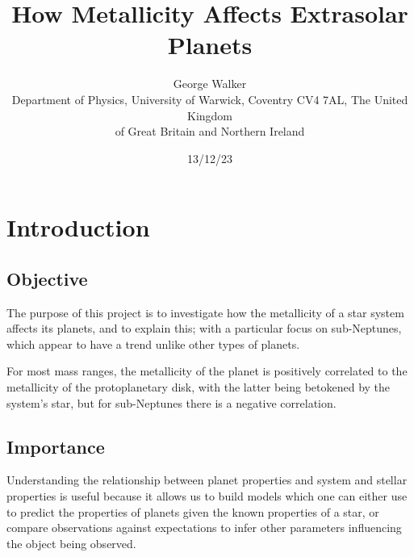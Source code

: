 \documentclass[a4paper,twocolumn,12pt]{article}
\begin{document}
\title{How Metallicity Affects Extrasolar Planets}

\author{George Walker \\
        \small
        Department of Physics, University of Warwick,
        Coventry CV4 7AL, The United Kingdom \\ \small of Great Britain and Northern Ireland}
\date{13/12/23}

\maketitle



\section{Introduction}
\label{section: Introduction}
\subsection{Objective}
\label{subsection: Objective}
The purpose of this project is to investigate how the metallicity of a star system affects its planets, and to explain this; with a particular focus on sub-Neptunes, which appear to have a trend unlike other types of planets.


For most mass ranges, the metallicity of the planet is positively correlated to the metallicity of the protoplanetary disk, with the latter being betokened by the system's star, but for sub-Neptunes there is a negative correlation.

\subsection{Importance}
\label{subsection: Importance}
Understanding the relationship between planet properties and system and stellar properties is useful because it allows us to build models which one can either use to predict the properties of planets given the known properties of a star, or compare observations against expectations to infer other parameters influencing the object being observed.
\end{document}
